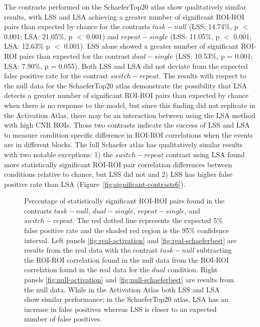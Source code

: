 \documentclass[phd,figures,tables,ackpage,abstractpage,publicabstractpage]{uithesis}
\begin{document}
The contrasts performed on the SchaeferTop20 atlas show qualitatively similar results,
with LSS and LSA achieving a greater number of significant ROI-ROI pairs
than expected by chance for the contrasts
$task - null$ (LSS: 14.74\%, p $<$ 0.001; LSA: 21.05\%, p $<$ 0.001) and
$repeat - single$ (LSS: 11.05\%, p $<$ 0.001; LSA: 12.63\% p $<$ 0.001).
LSS alone showed a greater number of significant ROI-ROI pairs than expected
for the contrast
$dual - single$ (LSS: 10.53\%, p = 0.001; LSA: 7.90\%, p = 0.055).
Both LSS and LSA did not deviate from the expected false positive rate for the contrast
$switch - repeat$.
The results with respect to the null data for the SchaeferTop20 atlas demonstrate
the possibility that LSA detects a greater number of significant ROI-ROI
pairs than expected by chance when there is no response to the model, but since this finding did not
replicate in the Activation Atlas, there may be an interaction between using the LSA method with
high CNR ROIs.
Those two contrasts indicate the success of LSS and LSA to measure
condition specific difference in ROI-ROI correlations when the events are in different blocks.
The full Schaefer atlas has qualitatively similar results with two notable exceptions:
1) the $switch - repeat$ contrast using LSA found more statistically significant
ROI-ROI pair correlation differences between conditions relative to chance,
but LSS did not and
2) LSS has higher false positive rate than LSA (Figure~\ref{fig:significant-contrasts6}).

\begin{figure}[H]
  \centering
  \hfill
  \vfill
  \hfill
  \caption[Comparison of LSS/LSA in participant data]{
    Percentage of statistically significant ROI-ROI pairs found
    in the contrasts $task - null$, $dual - single$, $repeat - single$, and
    $switch - repeat$.
    The red dotted line represents the expected 5\% false positive rate
    and the shaded red region is the 95\% confidence interval.
    Left panels \ref{fig:real-activation} and \ref{fig:real-schaeferbest}
    are results from the real data with the contrast $task - null$ subtracting the
    ROI-ROI correlation found in the null data from the ROI-ROI correlation found in the
    real data for the $dual$ condition.
    Right panels \ref{fig:null-activation} and \ref{fig:null-schaeferbest} are results
    from the null data.
    While in the Activation Atlas both LSS and LSA show similar performance;
    in the SchaeferTop20 atlas, LSA has an increase in false positives
    whereas LSS is closer to an expected number of false positives.
  }
\label{fig:main-result}
\end{figure}
\end{document}

